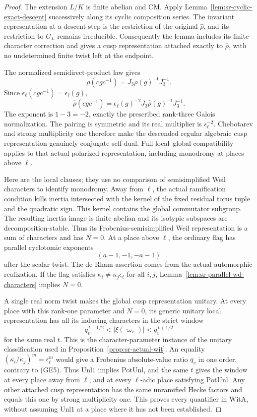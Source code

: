 \begin{proof}
The extension \(L/K\) is finite abelian and CM.
Apply Lemma~\ref{lem:sr-cyclic-exact-descent}
successively along its cyclic composition series.
The invariant representation at a descent step is the
restriction of the original \(\widehat\rho\), and its
restriction to \(G_L\) remains irreducible.
Consequently the lemma includes its finite-character
correction and gives a cusp representation attached
exactly to \(\widehat\rho\), with no undetermined
finite twist left at the endpoint.

The normalized semidirect-product law gives
\[
 \rho(cgc^{-1})=J_3\rho(g)^{-\mathsf t}J_3^{-1}.
\]
Since \(\epsilon_\ell(cgc^{-1})=\epsilon_\ell(g)\),
\[
 \widehat\rho(cgc^{-1})
       =\epsilon_\ell(g)^{-2}
                   J_3\widehat\rho(g)^{-\mathsf t}J_3^{-1}.
 \tag{GE3}
\]
The exponent is \(1-3=-2\), exactly the prescribed
rank-three Galois normalization.
The pairing is symmetric and its real multiplier is
\(\epsilon_\ell^{-2}\).
Chebotarev and strong multiplicity one therefore make
the descended regular algebraic cusp representation
genuinely conjugate self-dual.
Full local--global compatibility applies to that
actual polarized representation, including monodromy
at places above \(\ell\).

Here are the local clauses; they use no comparison of
semisimplified Weil characters to identify monodromy.
Away from \(\ell\), the actual ramification condition
kills inertia intersected with the kernel of the fixed
residual torus tuple and the quadratic sign.
This kernel contains the global commutator subgroup.
The resulting inertia image is finite abelian and its
isotypic subspaces are decomposition-stable.
Thus its Frobenius-semisimplified Weil representation
is a sum of characters and has \(N=0\).
At a place above \(\ell\), the ordinary flag has parallel
cyclotomic exponents
\[
                         (a-1,-1,-a-1)
 \tag{GE4}
\]
after the scalar twist.
The de Rham assertion comes from the actual automorphic
realization.
If the flag satisfies
\(\kappa_i\ne\kappa_j\epsilon_\ell\) for all \(i,j\),
Lemma~\ref{lem:sr-parallel-wd-characters} implies \(N=0\).

A single real norm twist makes the global cusp representation
unitary. At every place with this rank-one parameter
and \(N=0\), its generic unitary local representation
has all its inducing characters in the strict window
\[
                  q_v^{\,t-1/2}<|\xi(\varpi_v)|
                                         <q_v^{\,t+1/2}
 \tag{GE5}
\]
for the same real \(t\).
This is the character-parameter instance of the
unitary classification used in
Proposition~\ref{prop:sr-actual-wit}.
An equality
\((\kappa_i/\kappa_j)^m=\epsilon_\ell^m\)
would give a Frobenius absolute-value ratio \(q_v\)
in one order, contrary to (GE5).
Thus \(\mathrm{Unl1}\) implies \(\mathrm{PotUnl}\),
and the same \(t\) gives the window at every place
away from \(\ell\), and at every \(\ell\)-adic place
satisfying \(\mathrm{PotUnl}\).
Any other attached cusp representation has the same
unramified Hecke factors and equals this one by strong
multiplicity one.
This proves every quantifier in \(\mathrm{WitA}\),
without assuming \(\mathrm{Unl1}\) at a place where
it has not been established.


\end{proof}
